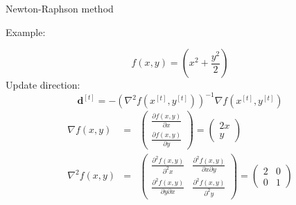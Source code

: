 \documentclass[11pt,compress,t,notes=noshow, xcolor=table]{beamer}
\begin{document}
\begin{vbframe}{Newton-Raphson method}

\framebreak

Example:

\lz

$$
f(x, y) = \left(x^2 + \frac{y^2}{2}\right)
$$
Update direction:
$$
\mathbf{d}^{[t]} = -\left( \nabla^2 f(x^{[t]}, y^{[t]}) \right)^{-1} \nabla f(x^{[t]}, y^{[t]})
$$
\begin{eqnarray*}
\nabla f(x, y) &=& \begin{pmatrix}
\frac{\partial f(x, y)}{\partial x} \\
\frac{\partial f(x, y)}{\partial y}
\end{pmatrix} = \begin{pmatrix}
2x \\
y
\end{pmatrix} \\
\nabla^2 f(x, y) &=& \begin{pmatrix}
\frac{\partial^2 f(x, y)}{\partial^2 x} & \frac{\partial^2 f(x, y)}{\partial x \partial y} \\
\frac{\partial^2 f(x, y)}{\partial y \partial x} & \frac{\partial^2 f(x, y)}{\partial^2 y}
\end{pmatrix} = \begin{pmatrix}
2 & 0 \\
0 & 1
\end{pmatrix}
\end{eqnarray*}

\framebreak


\end{vbframe}
\end{document}
